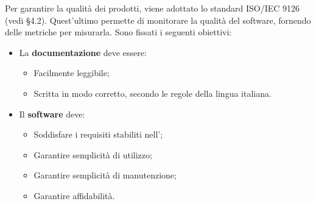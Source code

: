 Per garantire la qualità dei prodotti, viene adottato lo standard 
ISO/IEC 9126 (vedi \NdP \space §4.2). Quest'ultimo permette di monitorare 
la qualità del software, fornendo delle metriche per misurarla.\newline
Sono fissati i seguenti obiettivi:
\begin{itemize}
	\item La \textbf{documentazione} deve essere:
		\begin{itemize}
			\item Facilmente leggibile;
			\item Scritta in modo corretto, secondo le regole della lingua italiana.
		\end{itemize}
	\item Il \textbf{software} deve:
		\begin{itemize}
			\item Soddisfare i requisiti stabiliti nell'\AdR ;
			\item Garantire semplicità di utilizzo;			
			\item Garantire semplicità di manutenzione;
			\item Garantire affidabilità.
		\end{itemize}
		
\end{itemize}